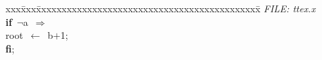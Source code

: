\documentclass{report}
\begin{document}
\pagestyle{empty}
\begin{tabbing}
xxx\=xxx\=xxxxxxxxxxxxxxxxxxxxxxxxxxxxxxxxxxxxxxxxxxxx\=\kill
{\tt{}}{\em{} FILE:    ttex.x}\\
{\bf if}\>\ $\neg$a\ $\Rightarrow$
\>\\
\>root\ $\leftarrow$\ b$+$1;\\
{\bf {f}{i}};
\\
\end{tabbing}
\end{document}
